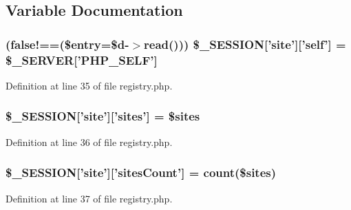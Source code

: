\subsection{\-Variable \-Documentation}
\hypertarget{registry_8php_a6bc6b477e436c6e6ec340bbbb3cc2a79}{
\subsubsection[{\$\-\_\-\-S\-E\-S\-S\-I\-O\-N}]{ (false!==(\$entry=\$d-\/$>$read())) \$\-\_\-\-S\-E\-S\-S\-I\-O\-N\mbox{[}'site'\mbox{]}\mbox{[}'self'\mbox{]} = \$\-\_\-\-S\-E\-R\-V\-E\-R\mbox{[}'\-P\-H\-P\-\_\-\-S\-E\-L\-F'\mbox{]}}}\label{registry_8php_a6bc6b477e436c6e6ec340bbbb3cc2a79}


\-Definition at line 35 of file registry.\-php.

\hypertarget{registry_8php_a505edf022e6892effb92f9c9a074b8d7}{
\subsubsection[{\$\-\_\-\-S\-E\-S\-S\-I\-O\-N}]{\setlength{\rightskip}{0pt plus 5cm}\$\-\_\-\-S\-E\-S\-S\-I\-O\-N\mbox{[}'site'\mbox{]}\mbox{[}'sites'\mbox{]} = \$sites}}\label{registry_8php_a505edf022e6892effb92f9c9a074b8d7}


\-Definition at line 36 of file registry.\-php.

\hypertarget{registry_8php_a1f620b114c18cb3aad5cf1969545da3f}{
\subsubsection[{\$\-\_\-\-S\-E\-S\-S\-I\-O\-N}]{\setlength{\rightskip}{0pt plus 5cm}\$\-\_\-\-S\-E\-S\-S\-I\-O\-N\mbox{[}'site'\mbox{]}\mbox{[}'sites\-Count'\mbox{]} = count(\$sites)}}\label{registry_8php_a1f620b114c18cb3aad5cf1969545da3f}


\-Definition at line 37 of file registry.\-php.

